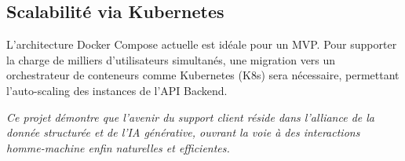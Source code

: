 \subsection{Scalabilité via Kubernetes}
L'architecture Docker Compose actuelle est idéale pour un MVP. Pour supporter la charge de milliers d'utilisateurs simultanés, une migration vers un orchestrateur de conteneurs comme Kubernetes (K8s) sera nécessaire, permettant l'auto-scaling des instances de l'API Backend.

\vspace{1cm}
\begin{center}
    \textit{Ce projet démontre que l'avenir du support client réside dans l'alliance de la donnée structurée et de l'IA générative, ouvrant la voie à des interactions homme-machine enfin naturelles et efficientes.}
\end{center}
